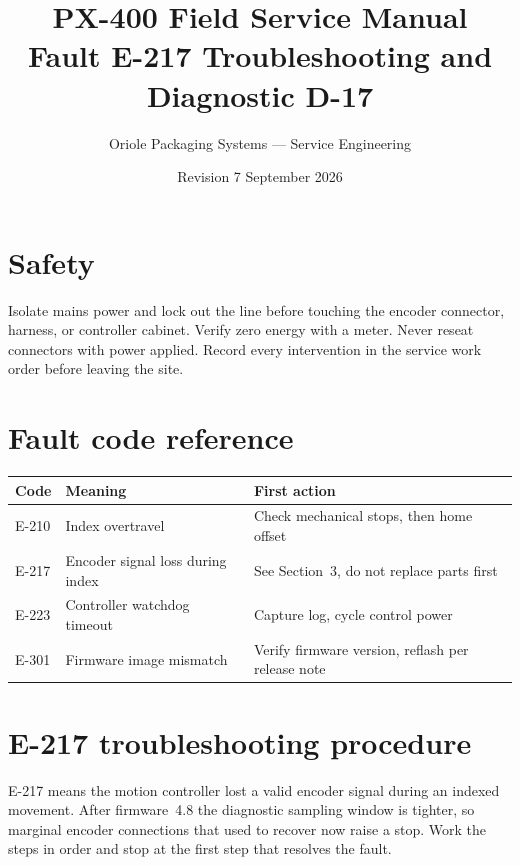 \documentclass[11pt,a4paper]{article}
\title{PX-400 Field Service Manual\\ \large Fault E-217 Troubleshooting and Diagnostic D-17}
\author{Oriole Packaging Systems --- Service Engineering}
\date{Revision 7 \quad September 2026}
\begin{document}
\maketitle

\section{Safety}
Isolate mains power and lock out the line before touching the encoder connector,
harness, or controller cabinet. Verify zero energy with a meter. Never reseat
connectors with power applied. Record every intervention in the service work
order before leaving the site.

\section{Fault code reference}
\begin{table}[h]
\centering
\begin{tabular}{lll}
\toprule
Code & Meaning & First action \\
\midrule
E-210 & Index overtravel & Check mechanical stops, then home offset \\
E-217 & Encoder signal loss during index & See Section~3, do not replace parts first \\
E-223 & Controller watchdog timeout & Capture log, cycle control power \\
E-301 & Firmware image mismatch & Verify firmware version, reflash per release note \\
\bottomrule
\end{tabular}
\end{table}

\section{E-217 troubleshooting procedure}
E-217 means the motion controller lost a valid encoder signal during an indexed
movement. After firmware~4.8 the diagnostic sampling window is tighter, so
marginal encoder connections that used to recover now raise a stop. Work the
steps in order and stop at the first step that resolves the fault.
\end{document}
